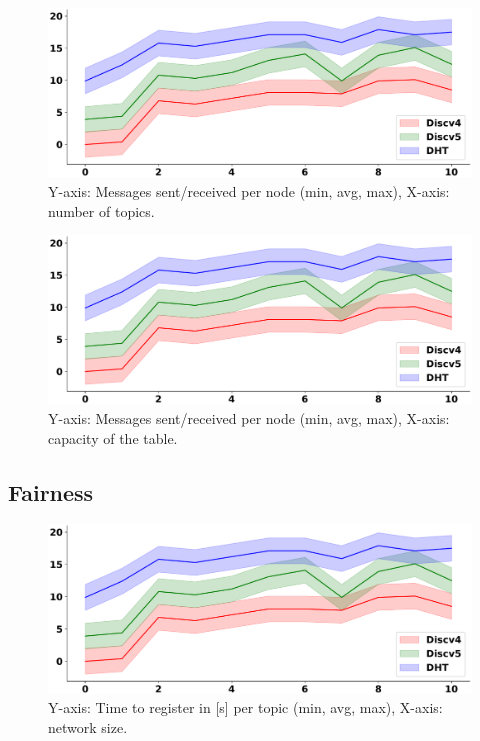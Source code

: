 \begin{figure}[!h]
\includegraphics[width=\linewidth]{img/placeholder_max_min}
\caption{Y-axis: Messages sent/received per node (min, avg, max), X-axis: number of topics.} 
\label{fig:efficiency_messages_topics}
\end{figure}


\begin{figure}[!h]
\includegraphics[width=\linewidth]{img/placeholder_max_min}
\caption{Y-axis: Messages sent/received per node (min, avg, max), X-axis: capacity of the table.} 
\label{fig:efficiency_messages_capacity}
\end{figure}


\subsection{Fairness}
\begin{figure}[!h]
\includegraphics[width=\linewidth]{img/placeholder_max_min}
\caption{Y-axis: Time to register in [s] per topic (min, avg, max), X-axis: network size.} 
\label{fig:fairness_time_to_register_size}
\end{figure}

